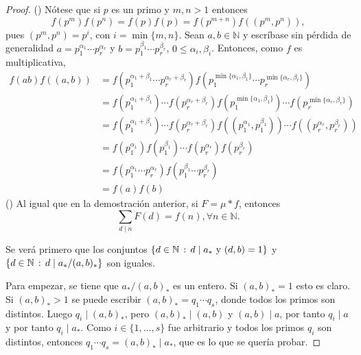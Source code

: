\begin{proof}
(\textsc{}) Nótese que si $p$ es un primo y $m,n > 1$ entonces
\begin{equation*}
    f(p^m)f(p^n) = f(p) f(p) = f(p^{m+n})f((p^m,p^n)),
\end{equation*}
pues $(p^m,p^n)=p^i$, con $i=\min \{ m,n \}$. Sean $a,b \in \mathbb{N}$ y escríbase sin pérdida de generalidad $a=p_1^{\alpha_1} \cdots p_r^{\alpha_r}$ y $b=p_1^{\beta_1} \cdots p_r^{\beta_r}$, $0 \le \alpha_i, \beta_i$. Entonces, como $f$ es multiplicativa,
\begin{align*}
    f(a b)f((a,b)) &= f(p_1^{\alpha_1+\beta_1} \cdots p_r^{\alpha_r+\beta_r}) f(p_1^{\min \{ \alpha_1,\beta_1 \}} \cdots p_r^{\min \{ \alpha_r,\beta_r \}}) \\
                   &= f(p_1^{\alpha_1+\beta_1}) \cdots f(p_r^{\alpha_r+\beta_r}) f(p_1^{\min \{ \alpha_1,\beta_1 \}}) \cdots f(p_r^{\min \{ \alpha_r,\beta_r \}}) \\
                   &= f(p_1^{\alpha_1+\beta_1}) \cdots f(p_r^{\alpha_r+\beta_r}) f((p_1^{\alpha_1},p_1^{\beta_1})) \cdots f((p_r^{\alpha_r},p_r^{\beta_r})) \\
                   &= f(p_1^{\alpha_1})f(p_1^{\beta_1}) \cdots f(p_r^{\alpha_r})f(p_r^{\beta_r}) \\
                   &= f(p_1^{\alpha_1} \cdots p_r^{\alpha_r})f(p_1^{\beta_1} \cdots p_r^{\beta_r}) \\
                   &= f(a)f(b)
\end{align*}
(\textsc{}) Al igual que en la demostración anterior, si $F=\mu * f$, entonces
\begin{equation*}
    \sum_{d \mid n} F(d) = f(n), \forall n \in \mathbb{N}.
\end{equation*}

Se verá primero que los conjuntos $\{ d \in \mathbb{N} \, : \, d \mid a_* \text{ y } (d,b)=1\}$ y $\{ d \in \mathbb{N} \, : \, d \mid a_* / (a,b)_* \}$ son iguales.
\bigskip

Para empezar, se tiene que $a_*/(a,b)_*$ es un entero. Si $(a,b)_*=1$ esto es claro. Si $(a,b)_*>1$ se puede escribir $(a,b)_*=q_1 \cdots q_s$, donde todos los primos son distintos. Luego $q_i \mid (a,b)_*$, pero $(a,b)_* \mid (a,b)$ y $(a,b) \mid a$, por tanto $q_i \mid a$ y por tanto $q_i \mid a_*$. Como $i \in \{ 1,\ldots,s \}$ fue arbitrario y todos los primos $q_i$ son distintos, entonces $q_1 \cdots q_s = (a,b)_* \mid a_*$, que es lo que se quería probar.
\bigskip


\end{proof}
